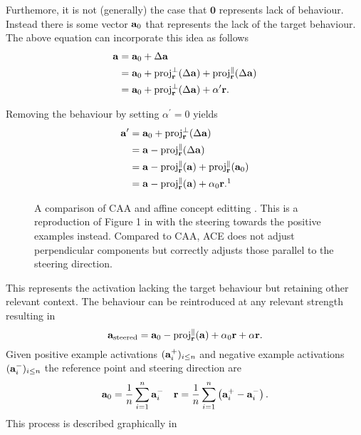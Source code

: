 Furthemore, it is not (generally) the case that $\mathbf{0}$ represents lack of behaviour.
Instead there is some vector $\mathbf{a}_0$ that represents the lack of the target behaviour.
The above equation can incorporate this idea as follows
\begin{align*}
    \mathbf{a} &= \mathbf{a}_0 + \Delta\mathbf{a} \\
        &= \mathbf{a}_0 + \text{proj}_{\mathbf{r}}^{\perp}(\Delta\mathbf{a}) + \text{proj}_{\mathbf{r}}^{\parallel}(\Delta\mathbf{a}) \\
        &= \mathbf{a}_0 + \text{proj}_{\mathbf{r}}^{\perp}(\Delta\mathbf{a}) + \alpha^\prime\mathbf{r}.
\end{align*}

Removing the behaviour by setting $\alpha^\prime = 0$ yields
\begin{align*}
    \va^\prime &= \va_0 + \text{proj}_\vr^{\perp}(\Delta\va) \\
               &= \va - \text{proj}_\vr^{\parallel}(\Delta\va) \\
               &= \va - \text{proj}_\vr^{\parallel}(\va) + \text{proj}_\vr^{\parallel}(\va_0) \\
               &= \va - \text{proj}_\vr^{\parallel}(\va) + \alpha_0\vr.\footnotemark[1]
\end{align*}

\begin{figure}
    \centering
    \captionsetup{width=.9\textwidth}
    
    \caption{A comparison of CAA \cite{caa} and affine concept editting \cite{ace}. This is a reproduction of Figure 1 in \citet{ace} with the steering towards the positive examples instead. Compared to CAA, ACE does not adjust perpendicular components but correctly adjusts those parallel to the steering direction.}
    \label{fig:ace}
\end{figure}

This represents the activation lacking the target behaviour but retaining other relevant context.
The behaviour can be reintroduced at any relevant strength resulting in
\begin{equation}
    \label{eq:ace}
    \mathbf{a}_\text{steered} = \mathbf{a}_0 - \text{proj}_{\mathbf{r}}^{\parallel}(\mathbf{a}) + \alpha_0\mathbf{r} + \alpha\mathbf{r}.
\end{equation}
Given positive example activations $(\mathbf{a}_i^+)_{i\le n}$ and negative example activations $(\mathbf{a}_i^-)_{i\le n}$ the reference point and steering direction are
\begin{align*}
    \mathbf{a}_0 = \frac{1}{n}\sum_{i=1}^{n}\mathbf{a}_i^- && \mathbf{r} = \frac{1}{n}\sum_{i=1}^{n}\left(\mathbf{a}_i^+ - \mathbf{a}_i^-\right).
\end{align*}
This process is described graphically in 


